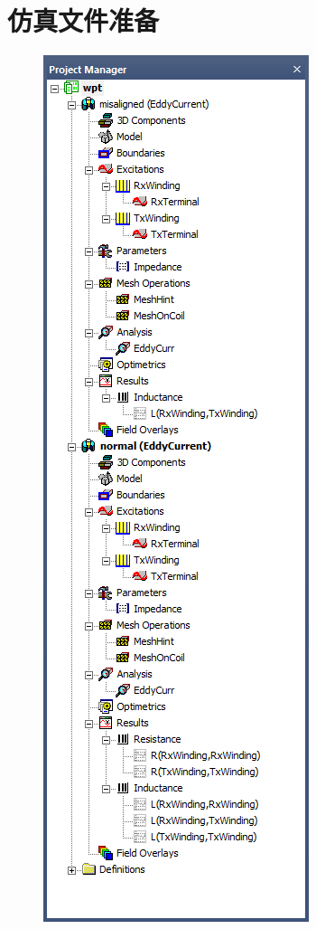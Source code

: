 \documentclass[index]{subfiles}
\begin{document}
\section{仿真文件准备}
\begin{figure}[h]
  \centering%
    {\includegraphics{./figures/example-proj.png}}

\end{figure}
\end{document}
